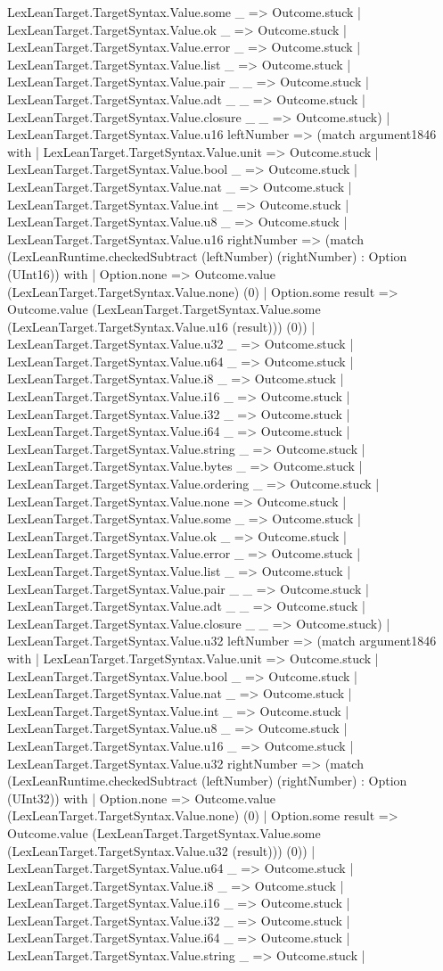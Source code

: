 \documentclass[11pt]{article}
\begin{document}
LexLeanTarget.TargetSyntax.Value.some \_ => Outcome.stuck | LexLeanTarget.TargetSyntax.Value.ok \_ => Outcome.stuck | LexLeanTarget.TargetSyntax.Value.error \_ => Outcome.stuck | LexLeanTarget.TargetSyntax.Value.list \_ => Outcome.stuck | LexLeanTarget.TargetSyntax.Value.pair \_ \_ => Outcome.stuck | LexLeanTarget.TargetSyntax.Value.adt \_ \_ => Outcome.stuck | LexLeanTarget.TargetSyntax.Value.closure \_ \_ => Outcome.stuck) | LexLeanTarget.TargetSyntax.Value.u16 leftNumber => (match argument1846 with | LexLeanTarget.TargetSyntax.Value.unit => Outcome.stuck | LexLeanTarget.TargetSyntax.Value.bool \_ => Outcome.stuck | LexLeanTarget.TargetSyntax.Value.nat \_ => Outcome.stuck | LexLeanTarget.TargetSyntax.Value.int \_ => Outcome.stuck | LexLeanTarget.TargetSyntax.Value.u8 \_ => Outcome.stuck | LexLeanTarget.TargetSyntax.Value.u16 rightNumber => (match (LexLeanRuntime.checkedSubtract (leftNumber) (rightNumber) : Option (UInt16)) with | Option.none => Outcome.value (LexLeanTarget.TargetSyntax.Value.none) (0) | Option.some result => Outcome.value (LexLeanTarget.TargetSyntax.Value.some (LexLeanTarget.TargetSyntax.Value.u16 (result))) (0)) | LexLeanTarget.TargetSyntax.Value.u32 \_ => Outcome.stuck | LexLeanTarget.TargetSyntax.Value.u64 \_ => Outcome.stuck | LexLeanTarget.TargetSyntax.Value.i8 \_ => Outcome.stuck | LexLeanTarget.TargetSyntax.Value.i16 \_ => Outcome.stuck | LexLeanTarget.TargetSyntax.Value.i32 \_ => Outcome.stuck | LexLeanTarget.TargetSyntax.Value.i64 \_ => Outcome.stuck | LexLeanTarget.TargetSyntax.Value.string \_ => Outcome.stuck | LexLeanTarget.TargetSyntax.Value.bytes \_ => Outcome.stuck | LexLeanTarget.TargetSyntax.Value.ordering \_ => Outcome.stuck | LexLeanTarget.TargetSyntax.Value.none => Outcome.stuck | LexLeanTarget.TargetSyntax.Value.some \_ => Outcome.stuck | LexLeanTarget.TargetSyntax.Value.ok \_ => Outcome.stuck | LexLeanTarget.TargetSyntax.Value.error \_ => Outcome.stuck | LexLeanTarget.TargetSyntax.Value.list \_ => Outcome.stuck | LexLeanTarget.TargetSyntax.Value.pair \_ \_ => Outcome.stuck | LexLeanTarget.TargetSyntax.Value.adt \_ \_ => Outcome.stuck | LexLeanTarget.TargetSyntax.Value.closure \_ \_ => Outcome.stuck) | LexLeanTarget.TargetSyntax.Value.u32 leftNumber => (match argument1846 with | LexLeanTarget.TargetSyntax.Value.unit => Outcome.stuck | LexLeanTarget.TargetSyntax.Value.bool \_ => Outcome.stuck | LexLeanTarget.TargetSyntax.Value.nat \_ => Outcome.stuck | LexLeanTarget.TargetSyntax.Value.int \_ => Outcome.stuck | LexLeanTarget.TargetSyntax.Value.u8 \_ => Outcome.stuck | LexLeanTarget.TargetSyntax.Value.u16 \_ => Outcome.stuck | LexLeanTarget.TargetSyntax.Value.u32 rightNumber => (match (LexLeanRuntime.checkedSubtract (leftNumber) (rightNumber) : Option (UInt32)) with | Option.none => Outcome.value (LexLeanTarget.TargetSyntax.Value.none) (0) | Option.some result => Outcome.value (LexLeanTarget.TargetSyntax.Value.some (LexLeanTarget.TargetSyntax.Value.u32 (result))) (0)) | LexLeanTarget.TargetSyntax.Value.u64 \_ => Outcome.stuck | LexLeanTarget.TargetSyntax.Value.i8 \_ => Outcome.stuck | LexLeanTarget.TargetSyntax.Value.i16 \_ => Outcome.stuck | LexLeanTarget.TargetSyntax.Value.i32 \_ => Outcome.stuck | LexLeanTarget.TargetSyntax.Value.i64 \_ => Outcome.stuck | LexLeanTarget.TargetSyntax.Value.string \_ => Outcome.stuck | 
\end{document}
